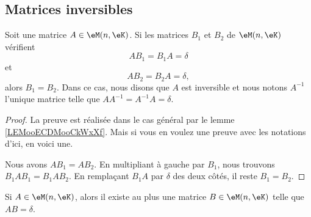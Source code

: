 \subsection{Matrices inversibles}

\begin{propositionDef}      \label{PROPooMLWRooRWfZXE}
	Soit une matrice \( A\in \eM(n,\eK)\). Si les matrices \( B_1\) et \( B_2\) de \( \eM(n,\eK)\) vérifient
	\begin{equation}
		AB_1=B_1A=\delta
	\end{equation}
	et
	\begin{equation}
		AB_2=B_2A=\delta,
	\end{equation}
	alors \( B_1=B_2\). Dans ce cas, nous disons que \( A\) est inversible et nous notons \( A^{-1}\) l'unique matrice telle que \( AA^{-1}=A^{-1}A=\delta\).
\end{propositionDef}

\begin{proof}
	La preuve est réalisée dans le cas général par le lemme \ref{LEMooECDMooCkWxXf}. Mais si vous en voulez une preuve avec les notations d'ici, en voici une.

	Nous avons \( AB_1=AB_2\). En multipliant à gauche par \( B_1\), nous trouvons \( B_1AB_1=B_1AB_2\). En remplaçant \( B_1A\) par \( \delta\) des deux côtés, il reste \( B_1=B_2\).
\end{proof}

\begin{lemma}        \label{LEMooGZCTooQigDvC}
	Si \( A\in \eM(n,\eK)\), alors il existe au plus une matrice \( B\in \eM(n,\eK)\) telle que \( AB=\delta\).
\end{lemma}

